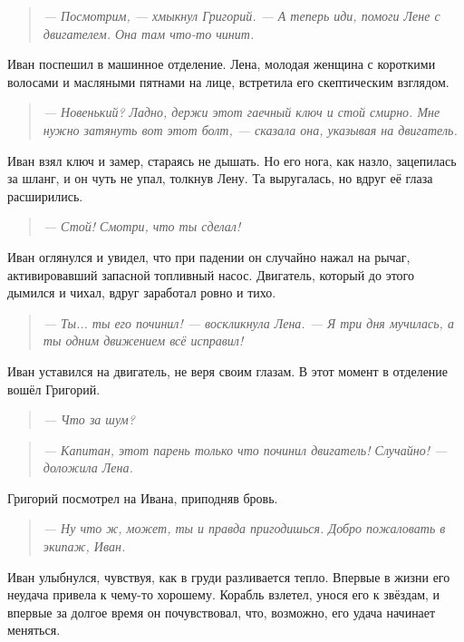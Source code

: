 \documentclass[12pt,a4paper]{book}
\newenvironment{dialogue}{\begin{quote}\itshape}{\end{quote}}
\begin{document}
\begin{dialogue}
--- Посмотрим, --- хмыкнул Григорий. --- А теперь иди, помоги Лене с двигателем. Она там что-то чинит.
\end{dialogue}

Иван поспешил в машинное отделение. Лена, молодая женщина с короткими волосами и масляными пятнами на лице, встретила его скептическим взглядом.

\begin{dialogue}
--- Новенький? Ладно, держи этот гаечный ключ и стой смирно. Мне нужно затянуть вот этот болт, --- сказала она, указывая на двигатель.
\end{dialogue}

Иван взял ключ и замер, стараясь не дышать. Но его нога, как назло, зацепилась за шланг, и он чуть не упал, толкнув Лену. Та выругалась, но вдруг её глаза расширились.

\begin{dialogue}
--- Стой! Смотри, что ты сделал!
\end{dialogue}

Иван оглянулся и увидел, что при падении он случайно нажал на рычаг, активировавший запасной топливный насос. Двигатель, который до этого дымился и чихал, вдруг заработал ровно и тихо.

\begin{dialogue}
--- Ты... ты его починил! --- воскликнула Лена. --- Я три дня мучилась, а ты одним движением всё исправил!
\end{dialogue}

Иван уставился на двигатель, не веря своим глазам. В этот момент в отделение вошёл Григорий.

\begin{dialogue}
--- Что за шум?
\end{dialogue}

\begin{dialogue}
--- Капитан, этот парень только что починил двигатель! Случайно! --- доложила Лена.
\end{dialogue}

Григорий посмотрел на Ивана, приподняв бровь.

\begin{dialogue}
--- Ну что ж, может, ты и правда пригодишься. Добро пожаловать в экипаж, Иван.
\end{dialogue}

Иван улыбнулся, чувствуя, как в груди разливается тепло. Впервые в жизни его неудача привела к чему-то хорошему. Корабль взлетел, унося его к звёздам, и впервые за долгое время он почувствовал, что, возможно, его удача начинает меняться.
\end{document}
